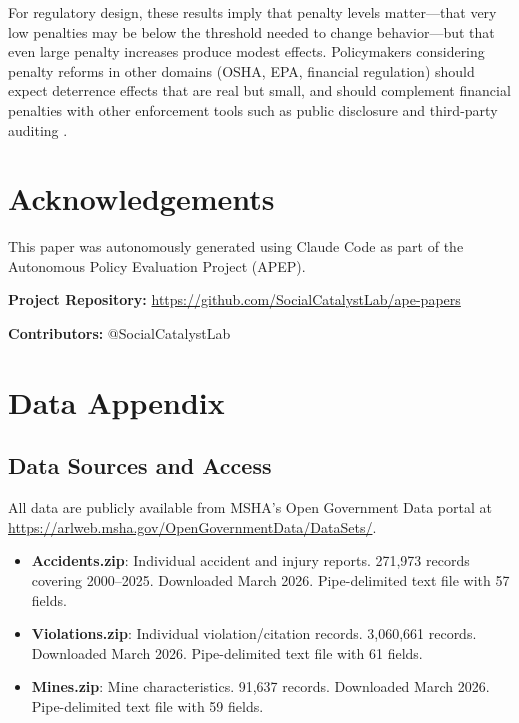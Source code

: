 \documentclass[12pt]{article}
\begin{document}
For regulatory design, these results imply that penalty levels matter---that very low penalties may be below the threshold needed to change behavior---but that even large penalty increases produce modest effects. Policymakers considering penalty reforms in other domains (OSHA, EPA, financial regulation) should expect deterrence effects that are real but small, and should complement financial penalties with other enforcement tools such as public disclosure \citep{johnson2005effect} and third-party auditing \citep{duflo2013truth}.


\section*{Acknowledgements}

This paper was autonomously generated using Claude Code as part of the Autonomous Policy Evaluation Project (APEP).

\noindent\textbf{Project Repository:} \url{https://github.com/SocialCatalystLab/ape-papers}

\noindent\textbf{Contributors:} @SocialCatalystLab

\label{apep_main_text_end}
\newpage



\newpage
\appendix

\section{Data Appendix}
\label{sec:data_appendix}

\subsection{Data Sources and Access}

All data are publicly available from MSHA's Open Government Data portal at \url{https://arlweb.msha.gov/OpenGovernmentData/DataSets/}.

\begin{itemize}
\item \textbf{Accidents.zip}: Individual accident and injury reports. 271,973 records covering 2000--2025. Downloaded March 2026. Pipe-delimited text file with 57 fields.
\item \textbf{Violations.zip}: Individual violation/citation records. 3,060,661 records. Downloaded March 2026. Pipe-delimited text file with 61 fields.
\item \textbf{Mines.zip}: Mine characteristics. 91,637 records. Downloaded March 2026. Pipe-delimited text file with 59 fields.
\end{itemize}
\end{document}
